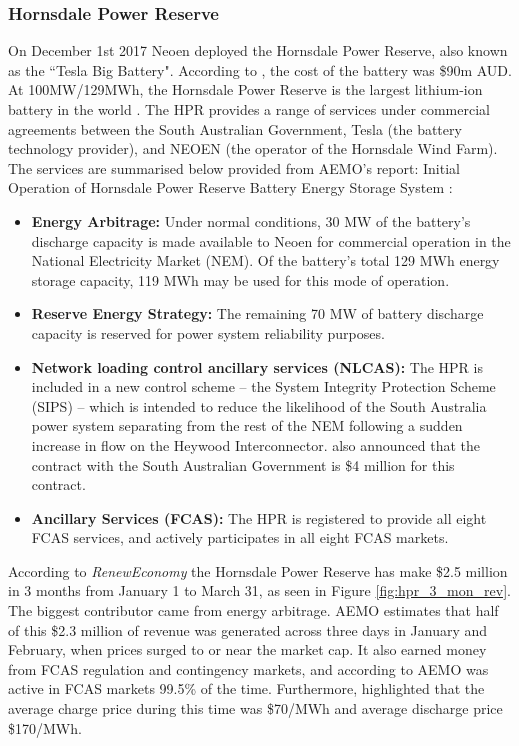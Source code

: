\subsubsection{ Hornsdale Power Reserve }
\label{hornsdale}
On December 1st 2017 Neoen deployed the Hornsdale Power Reserve, also known as the ``Tesla Big Battery". According to \parencite{HornsdaleRenewEconomy}, the cost of the battery was \$90m AUD. At 100MW/129MWh, the Hornsdale Power Reserve is the largest lithium-ion battery in the world \parencite{HornsdaleWebsite}. The HPR provides a range of services under commercial agreements between the South Australian Government, Tesla (the battery technology provider), and NEOEN (the operator of the Hornsdale Wind Farm). The services are summarised below provided from AEMO's report: Initial Operation of Hornsdale Power Reserve Battery Energy Storage System \parencite{HornsdaleReport}:
\begin{itemize}
    \item \textbf{Energy Arbitrage:} Under normal conditions, 30 MW of the battery’s discharge capacity is made available to Neoen for commercial operation in the National Electricity Market (NEM). Of the battery’s total 129 MWh energy storage capacity, 119 MWh may be used for this mode of operation.
    \item \textbf{Reserve Energy Strategy:} The remaining 70 MW of battery discharge capacity is reserved for power system reliability purposes.
    \item \textbf{Network loading control ancillary services (NLCAS):} The HPR is included in a new control scheme – the System Integrity Protection Scheme (SIPS) – which is intended to reduce the likelihood of the South Australia power system separating from the rest of the NEM following a sudden increase in flow on the Heywood Interconnector. \parencite{HornsdaleRenewEconomy} also announced that the contract with the South Australian Government is \$4 million for this contract. 
    \item \textbf{Ancillary Services (FCAS):} The HPR is registered to provide all eight FCAS services, and actively participates in all eight FCAS markets.
\end{itemize}
According to \textit{RenewEconomy} the Hornsdale Power Reserve has make \$2.5 million  in 3 months from January 1 to March 31, as seen in Figure \ref{fig:hpr_3_mon_rev}. The biggest contributor came from energy arbitrage. AEMO estimates that half of this \$2.3 million of revenue was generated across three days in January and February, when prices surged to or near the market cap. It also earned money from FCAS regulation and contingency markets, and according to AEMO was active in FCAS markets 99.5\% of the time. Furthermore, \textcite{HornsdaleRenewEconomy} highlighted that the average charge price during this time was \$70/MWh and average discharge price \$170/MWh. 
